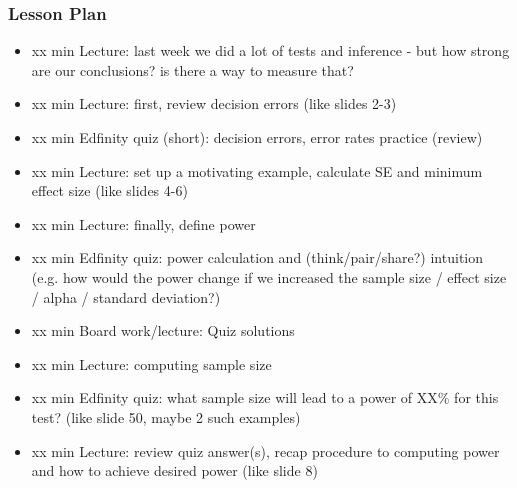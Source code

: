 \begin{frame}
    \frametitle{Lesson Plan}
    \begin{itemize}
        \item xx min Lecture: last week we did a lot of tests and inference - but how strong are our conclusions? is there a way to measure that?
        \item xx min Lecture: first, review decision errors (like slides 2-3)
        \item xx min Edfinity quiz (short): decision errors, error rates practice (review)
        \item xx min Lecture: set up a motivating example, calculate SE and minimum effect size (like slides 4-6)
        \item xx min Lecture: finally, define power
        \item xx min Edfinity quiz: power calculation and (think/pair/share?) intuition (e.g. how would the power change if we increased the sample size / effect size / alpha / standard deviation?)
        \item xx min Board work/lecture: Quiz solutions
        \item xx min Lecture: computing sample size
        \item xx min Edfinity quiz: what sample size will lead to a power of XX\% for this test? (like slide 50, maybe 2 such examples) 
        \item xx min Lecture: review quiz answer(s), recap procedure to computing power and how to achieve desired power (like slide 8)
    \end{itemize}
\end{frame}

